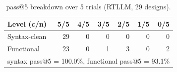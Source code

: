 \begin{table}[t]
\centering
\caption{pass@5 breakdown over 5 trials (RTLLM, 29 designs).}
\label{tab:pass5_breakdown_rtllm}
\begin{tabular}{lrrrrrr}
\toprule
Level (c/n) & 5/5 & 4/5 & 3/5 & 2/5 & 1/5 & 0/5 \\
\midrule
Syntax-clean & 29 & 0 & 0 & 0 & 0 & 0 \\
Functional & 23 & 0 & 1 & 3 & 0 & 2 \\
\midrule
\multicolumn{7}{l}{syntax pass@5 = 100.0\%, functional pass@5 = 93.1\%} \\
\bottomrule
\end{tabular}
\end{table}
